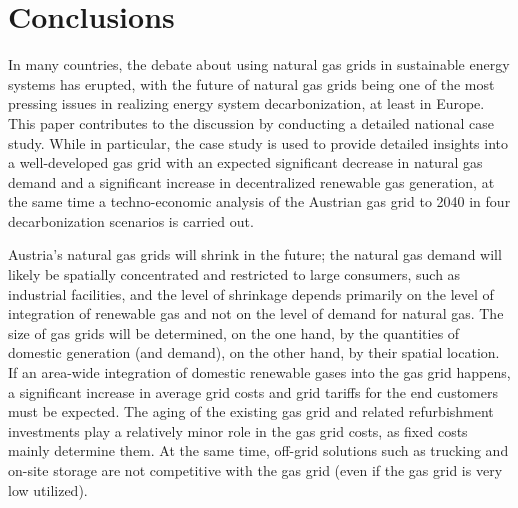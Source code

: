 \section{Conclusions}\label{conclusions}
In many countries, the debate about using natural gas grids in sustainable energy systems has erupted, with the future of natural gas grids being one of the most pressing issues in realizing energy system decarbonization, at least in Europe. This paper contributes to the discussion by conducting a detailed national case study. While in particular, the case study is used to provide detailed insights into a well-developed gas grid with an expected significant decrease in natural gas demand and a significant increase in decentralized renewable gas generation, at the same time a techno-economic analysis of the Austrian gas grid to 2040 in four decarbonization scenarios is carried out.\vspace{0.3cm}

Austria's natural gas grids will shrink in the future; the natural gas demand will likely be spatially concentrated and restricted to large consumers, such as industrial facilities, and the level of shrinkage depends primarily on the level of integration of renewable gas and not on the level of demand for natural gas. The size of gas grids will be determined, on the one hand, by the quantities of domestic generation (and demand), on the other hand, by their spatial location. If an area-wide integration of domestic renewable gases into the gas grid happens, a significant increase in average grid costs and grid tariffs for the end customers must be expected. The aging of the existing gas grid and related refurbishment investments play a relatively minor role in the gas grid costs, as fixed costs mainly determine them. At the same time, off-grid solutions such as trucking and on-site storage are not competitive with the gas grid (even if the gas grid is very low utilized).\vspace{0.3cm}

